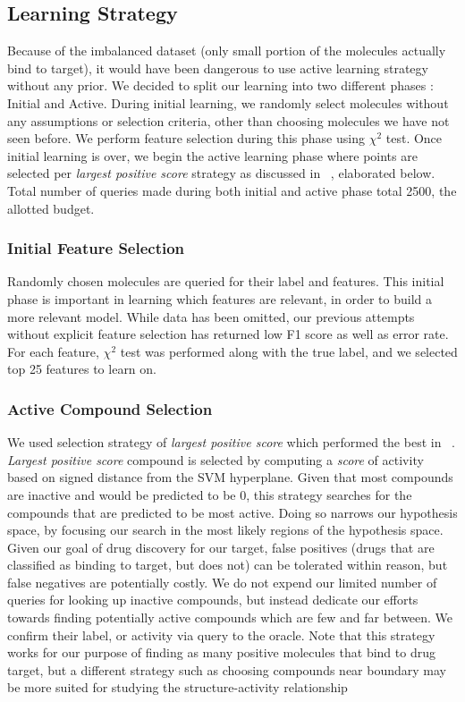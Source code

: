 \documentclass[paper=a4, fontsize=11pt]{scrartcl}
\numberwithin{equation}{section}    %
\numberwithin{figure}{section}      %
\numberwithin{table}{section}       %
\numberwithin{equation}{section}    %
\numberwithin{figure}{section}      %
\numberwithin{table}{section}       %
\begin{document}
\subsection{Learning Strategy}

Because of the imbalanced dataset (only small portion of the molecules actually bind to target), it would have been dangerous to use active learning strategy without any prior. We decided to split our learning into two different phases : Initial and Active. During initial learning, we randomly select molecules without any assumptions or selection criteria, other than choosing molecules we have not seen before. We perform feature selection during this phase using $\chi^2$ test. Once initial learning is over, we begin the active learning phase where points are selected per \textit{largest positive score} strategy as discussed in ~\cite{ref:warmuth}, elaborated below. Total number of queries made during both initial and active phase total 2500, the allotted budget. 


\subsubsection{Initial Feature Selection}

Randomly chosen molecules are queried for their label and features. This initial phase is important in learning which features are relevant, in order to build a more relevant model. While data has been omitted, our previous attempts without explicit feature selection has returned low F1 score as well as error rate. For each feature, $\chi^2$ test was performed along with the true label, and we selected top 25 features to learn on.

\subsubsection{Active Compound Selection}

We used selection strategy of \textit{largest positive score} which performed the best in ~\cite{ref:warmuth}. \textit{Largest positive score} compound is selected by computing a \textit{score} of activity based on signed distance from the SVM hyperplane. Given that most compounds are inactive and would be predicted to be 0, this strategy searches for the compounds that are predicted to be most active. Doing so narrows our hypothesis space, by focusing our search in the most likely regions of the hypothesis space. Given our goal of drug discovery for our target, false positives (drugs that are classified as binding to target, but does not) can be tolerated within reason, but false negatives are potentially costly. We do not expend our limited number of queries for looking up inactive compounds, but instead dedicate our efforts towards finding potentially active compounds which are few and far between. We confirm their label, or activity via query to the oracle. Note that this strategy works for our purpose of finding as many positive molecules that bind to drug target, but a different strategy such as choosing compounds near boundary may be more suited for studying the structure-activity relationship ~\cite{ref:warmuth}
\end{document}
